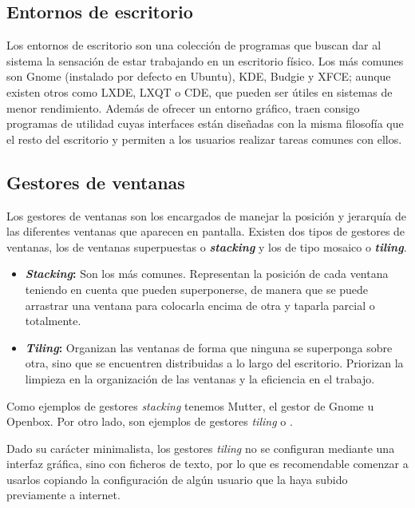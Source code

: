 \subsection{Entornos de escritorio}

Los entornos de escritorio son una colección de programas que buscan dar al sistema la sensación de estar trabajando en un escritorio físico.
Los más comunes son Gnome (instalado por defecto en Ubuntu), KDE, Budgie y XFCE\@; aunque existen otros como LXDE, LXQT o CDE, que pueden ser útiles en sistemas de menor rendimiento.
Además de ofrecer un entorno gráfico, traen consigo programas de utilidad cuyas interfaces están diseñadas con la misma filosofía que el resto del escritorio y permiten a los usuarios realizar tareas comunes con ellos.

\subsection{Gestores de ventanas}

Los gestores de ventanas son los encargados de manejar la posición y jerarquía de las diferentes ventanas que aparecen en pantalla.
Existen dos tipos de gestores de ventanas, los de ventanas superpuestas o \textbf{\textit{stacking}} y los de tipo mosaico o \textbf{\textit{tiling}}.

\begin{itemize}
	\item\textbf{\textit{Stacking}:} Son los más comunes. Representan la posición de cada ventana teniendo en cuenta que pueden superponerse, de manera que se puede arrastrar una ventana para colocarla encima de otra y taparla parcial o totalmente.
	\item\textbf{\textit{Tiling}:} Organizan las ventanas de forma que ninguna se superponga sobre otra, sino que se encuentren distribuidas a lo largo del escritorio. Priorizan la limpieza en la organización de las ventanas y la eficiencia en el trabajo.
\end{itemize}

Como ejemplos de gestores \textit{stacking} tenemos Mutter, el gestor de Gnome u Openbox.
Por otro lado, son ejemplos de gestores \textit{tiling}  o .

Dado su carácter minimalista, los gestores \textit{tiling} no se configuran mediante una interfaz gráfica, sino con ficheros de texto, por lo que es recomendable comenzar a usarlos copiando la configuración de algún usuario que la haya subido previamente a internet.

